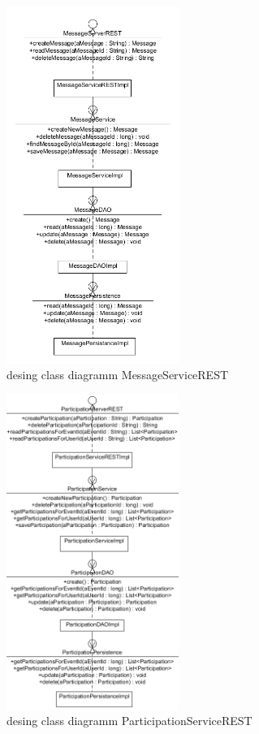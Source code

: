 \begin{figure}[htp]
\centering
\includegraphics[width=0.5\textwidth]{Ingo/pictures/Design_Message.png}
\caption{desing class diagramm MessageServiceREST}
\label{fig:MessageServiceREST}
\end{figure}


\begin{figure}[htp]
\centering
\includegraphics[width=0.5\textwidth]{Ingo/pictures/Design_Participation.png}
\caption{desing class diagramm ParticipationServiceREST}
\label{fig:ParticipationServiceREST}
\end{figure}
